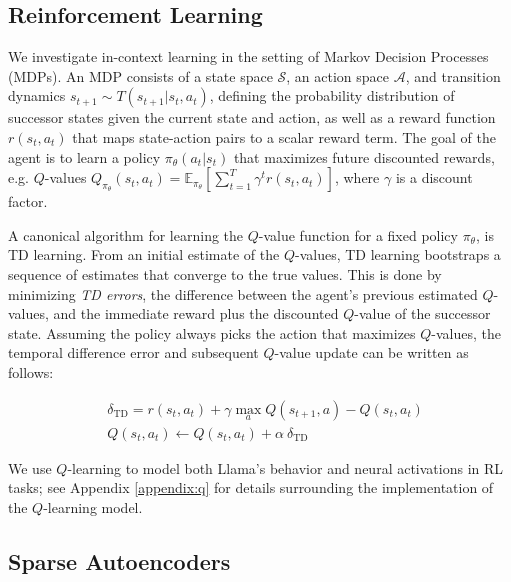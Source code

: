 \documentclass{article} %
\newcommand{\state}{s_t}
\newcommand{\nextstate}{s_{t+1}}
\newcommand{\action}{a_t}
\newcommand{\policy}{\pi_{\theta}}
\newcommand{\reward}{r(\state, \action)}
\newcommand{\Q}{Q(\state, \action)}
\newcommand{\Qtarget}{Q(\nextstate, a)}
\begin{document}
\subsection{Reinforcement Learning}

We investigate in-context learning in the setting of Markov Decision Processes (MDPs). An MDP consists of a state space $\mathcal{S}$, an action space $\mathcal{A}$, and transition dynamics $\nextstate \sim T(\nextstate|\state, \action)$, defining the probability distribution of successor states given the current state and action, as well as a reward function $r(\state, \action)$ that maps state-action pairs to a scalar reward term. The goal of the agent is to learn a policy $\policy(\action|\state)$ that maximizes future discounted rewards, e.g. $Q$-values $Q_{\policy}(\state, \action) = \mathbb{E}_{\policy} \left[\sum_{t=1}^{T} \gamma^t r(\state, \action)\right]$, where $\gamma$ is a discount factor.

A canonical algorithm for learning the $Q$-value function for a fixed policy $\policy$, is TD learning. From an initial estimate of the $Q$-values, TD learning bootstraps a sequence of estimates that converge to the true values. This is done by minimizing \emph{TD errors}, the difference between the agent's previous estimated $Q$-values, and the immediate reward plus the discounted $Q$-value of the successor state. Assuming the policy always picks the action that maximizes $Q$-values, the temporal difference error and subsequent $Q$-value update can be written as follows:

\begin{align}
    &\delta_{\text{TD}} = \reward + \gamma \max_a \Qtarget - \Q\label{eq:TD}\\
    &\Q \leftarrow \Q + \alpha \ \delta_{\text{TD}}\label{eq:TD_Update}
\end{align}

We use $Q$-learning to model both Llama's behavior and neural activations in RL tasks; see Appendix \ref{appendix:q} for details surrounding the implementation of the $Q$-learning model. 



\subsection{Sparse Autoencoders}
\end{document}

